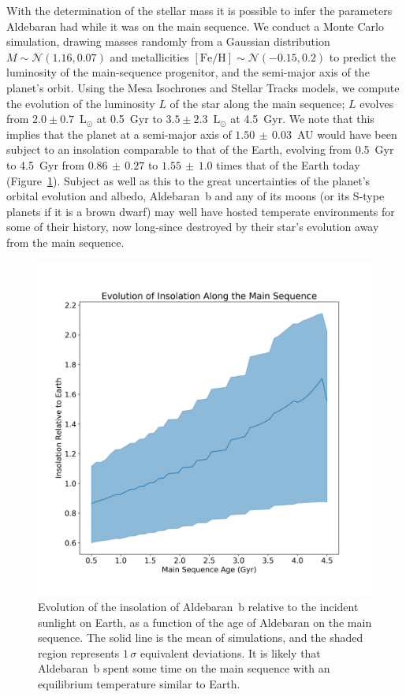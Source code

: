 \documentclass[modern]{aastex61}
\newcommand{\lsun}{\mbox{$\mathrm{L}_{\odot}$}\xspace}
\begin{document}
With the determination of the stellar mass it is possible to infer the parameters Aldebaran had while it was on the main sequence. We conduct a Monte Carlo simulation, drawing masses randomly from a Gaussian distribution $M \sim \mathcal{N}(1.16,0.07)$ and metallicities $[\text{Fe}/\text{H}] \sim \mathcal{N}(-0.15,0.2)$ \citep{decin2003} to predict the luminosity of the main-sequence progenitor, and the semi-major axis of the planet's orbit.
Using the Mesa Isochrones and Stellar Tracks \citep[MIST:][]{mist0,mist1} models, we compute the evolution of the luminosity $L$ of the star along the main sequence; $L$ evolves from $2.0 \pm 0.7$~\lsun at 0.5~Gyr to $3.5 \pm 2.3$~\lsun at 4.5~Gyr.
We note that this implies that the planet at a semi-major axis of $1.50\, \pm\, 0.03$~AU would have been subject to an insolation comparable to that of the Earth, evolving from 0.5~Gyr to 4.5~Gyr from $0.86\, \pm\, 0.27$ to $1.55 \,\pm\,1.0$ times that of the Earth today (Figure~\ref{insolation}). Subject as well as this to the great uncertainties of the planet's orbital evolution and albedo, Aldebaran~b and any of its moons (or its S-type planets if it is a brown dwarf) may well have hosted temperate environments for some of their history, now long-since destroyed by their star's evolution away from the main sequence.


\begin{figure}
\centering
\includegraphics[width=\textwidth]{insolation.png}
\caption{Evolution of the insolation of Aldebaran~b relative to the incident sunlight on Earth, as a function of the age of Aldebaran on the main sequence. The solid line is the mean of simulations, and the shaded region represents $1\,\sigma$ equivalent deviations. It is likely that Aldebaran~b spent some time on the main sequence with an equilibrium temperature similar to Earth.}
\label{insolation}
\end{figure}
\end{document}
